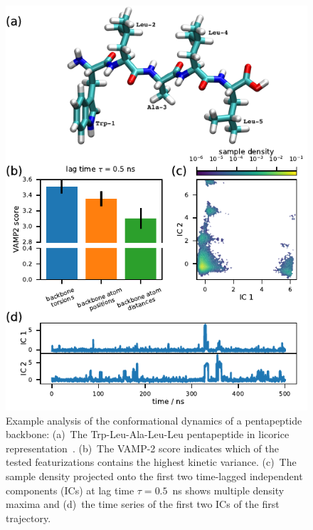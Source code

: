 \documentclass[9pt,tutorial]{livecoms}
\begin{document}
\begin{figure}
\includegraphics{figure_2}
\caption{Example analysis of the conformational dynamics of a pentapeptide backbone: (a)~The Trp-Leu-Ala-Leu-Leu pentapeptide in licorice representation~\cite{vmd}.
(b)~The VAMP-2 score indicates which of the tested featurizations contains the highest kinetic variance.
(c)~The sample density projected onto the first two time-lagged independent components (ICs) at lag time $\tau=0.5$~ns shows multiple density maxima and
(d)~the time series of the first two ICs of the first trajectory.}
\label{fig:io-to-tica}
\end{figure}
\end{document}
